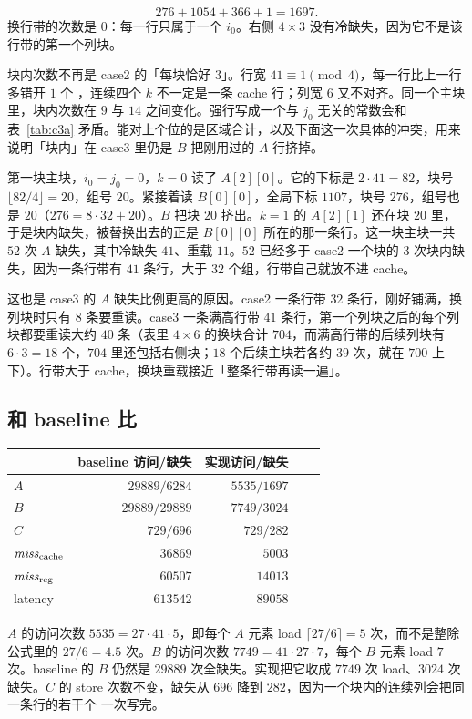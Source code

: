 \[
276+1054+366+1=1697.
\]
换行带的次数是 $0$：每一行只属于一个 $i_0$。右侧 $4\times3$ 没有冷缺失，因为它不是该行带的第一个列块。

块内次数不再是 case2 的「每块恰好 $3$」。行宽 $41\equiv 1\pmod 4$，每一行比上一行多错开 $1$ 个 ，连续四个 $k$ 不一定是一条 cache 行；列宽 $6$ 又不对齐。同一个主块里，块内次数在 $9$ 与 $14$ 之间变化。强行写成一个与 $j_0$ 无关的常数会和表~\ref{tab:c3a} 矛盾。能对上个位的是区域合计，以及下面这一次具体的冲突，用来说明「块内」在 case3 里仍是 $B$ 把刚用过的 $A$ 行挤掉。

第一块主块，$i_0=j_0=0$，$k=0$ 读了 $A[2][0]$。它的下标是 $2\cdot41=82$，块号 $\lfloor82/4\rfloor=20$，组号 $20$。紧接着读 $B[0][0]$，全局下标 $1107$，块号 $276$，组号也是 $20$（$276=8\cdot32+20$）。$B$ 把块 $20$ 挤出。$k=1$ 的 $A[2][1]$ 还在块 $20$ 里，于是块内缺失，被替换出去的正是 $B[0][0]$ 所在的那一条行。这一块主块一共 $52$ 次 $A$ 缺失，其中冷缺失 $41$、重载 $11$。$52$ 已经多于 case2 一个块的 $3$ 次块内缺失，因为一条行带有 $41$ 条行，大于 $32$ 个组，行带自己就放不进 cache。

这也是 case3 的 $A$ 缺失比例更高的原因。case2 一条行带 $32$ 条行，刚好铺满，换列块时只有 $8$ 条要重读。case3 一条满高行带 $41$ 条行，第一个列块之后的每个列块都要重读大约 $40$ 条（表里 $4\times6$ 的换块合计 $704$，而满高行带的后续列块有 $6\cdot3=18$ 个，$704$ 里还包括右侧块；$18$ 个后续主块若各约 $39$ 次，就在 $700$ 上下）。行带大于 cache，换块重载接近「整条行带再读一遍」。

\subsection{和 baseline 比}

\begin{center}
\small
\begin{tabular}{@{}lrrrr@{}}
\toprule
 & baseline 访问/缺失 & 实现访问/缺失\\
\midrule
$A$ & $29889/6284$ & $5535/1697$\\
$B$ & $29889/29889$ & $7749/3024$\\
$C$ & $729/696$ & $729/282$\\
$\mathit{miss}_{\mathrm{cache}}$ & $36869$ & $5003$\\
$\mathit{miss}_{\mathrm{reg}}$ & $60507$ & $14013$\\
latency & $613542$ & $89058$\\
\bottomrule
\end{tabular}
\end{center}

$A$ 的访问次数 $5535=27\cdot41\cdot5$，即每个 $A$ 元素 load $\lceil27/6\rceil=5$ 次，而不是整除公式里的 $27/6=4.5$ 次。$B$ 的访问次数 $7749=41\cdot27\cdot7$，每个 $B$ 元素 load $7$ 次。baseline 的 $B$ 仍然是 $29889$ 次全缺失。实现把它收成 $7749$ 次 load、$3024$ 次缺失。$C$ 的 store 次数不变，缺失从 $696$ 降到 $282$，因为一个块内的连续列会把同一条行的若干个  一次写完。


